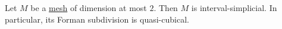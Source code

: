 \begin{proposition}
  Let $M$ be a \hyperref[idec:mesh:definition]{mesh} of dimension at most $2$.
  Then $M$ is interval-simplicial.
  In particular, its Forman subdivision is quasi-cubical.
\end{proposition}
